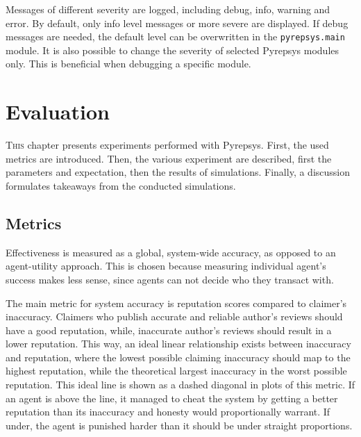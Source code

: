 \documentclass[%
    ]{\PathToTumTemplate/thesis/tum_thesis}
\begin{document}
Messages of different severity are logged, including debug, info, warning and error.
By default, only info level messages or more severe are displayed.
If debug messages are needed, the default level can be overwritten in the \texttt{pyrepsys.main} module.
It is also possible to change the severity of selected Pyrepsys modules only.
This is beneficial when debugging a specific module.




\chapter{Evaluation} \label{chap:evaluation}

\lettrine{T}{his} chapter presents experiments performed with Pyrepsys.
First, the used metrics are introduced.
Then, the various experiment are described, first the parameters and expectation, then the results of simulations.
Finally, a discussion formulates takeaways from the conducted simulations.

\section{Metrics}\label{sec:metrics}

Effectiveness is measured as a global, system-wide accuracy, as opposed to an agent-utility approach.
This is chosen because measuring individual agent's success makes less sense, since agents can not decide who they transact with.

The main metric for system accuracy is reputation scores compared to claimer's inaccuracy.
Claimers who publish accurate and reliable author's reviews should have a good reputation, while, inaccurate author's reviews should result in a lower reputation.
This way, an ideal linear relationship exists between inaccuracy and reputation, where the lowest possible claiming inaccuracy should map to the highest reputation, while the theoretical largest inaccuracy in the worst possible reputation.
This ideal line is shown as a dashed diagonal in plots of this metric.
If an agent is above the line, it managed to cheat the system by getting a better reputation than its inaccuracy and honesty would proportionally warrant.
If under, the agent is punished harder than it should be under straight proportions.
\end{document}
